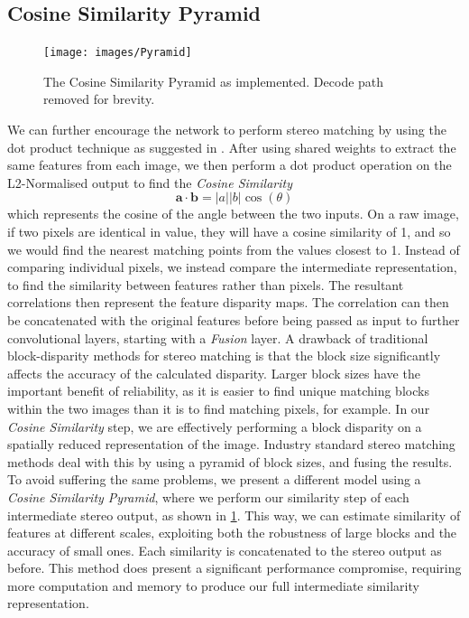 \documentclass[ %
                    author={Gavin Parker},
                supervisor={Dr. Neill Campbell},
                    degree={MEng},
                     title={Deep Learning for Illumination Estimation from Stereo Images},
                  subtitle={},
                      type={Research},
                      year={2018} ]{dissertation}
\begin{document}
\subsection{Cosine Similarity Pyramid}
\begin{figure}[H]
\label{fig:pyramid}
\centering
\texttt{[image: images/Pyramid]}
\caption{The Cosine Similarity Pyramid as implemented. Decode path removed for brevity.}
\end{figure}
We can further encourage the network to perform stereo matching by using the dot product technique as suggested in \cite{7780983}. After using shared weights to extract the same features from each image, we then perform a dot product operation on the L2-Normalised output to find the \textit{Cosine Similarity}
\[\bm{a}\cdot \bm{b} = \lvert a \rvert \lvert b\rvert \cos(\theta) \]
which represents the cosine of the angle between the two inputs. On a raw image, if two pixels are identical in value, they will have a cosine similarity of 1, and so we would find the nearest matching points from the values closest to 1. Instead of comparing individual pixels, we instead compare the intermediate representation, to find the similarity between features rather than pixels. The resultant correlations then represent the feature disparity maps. The correlation can then be concatenated with the original features before being passed as input to further convolutional layers, starting with a \textit{Fusion} layer.
\newline
A drawback of traditional block-disparity methods for stereo matching is that the block size significantly affects the accuracy of the calculated disparity. Larger block sizes have the important benefit of reliability, as it is easier to find unique matching blocks within the two images than it is to find matching pixels, for example. In our \textit{Cosine Similarity} step, we are effectively performing a block disparity on a spatially reduced representation of the image. Industry standard stereo matching methods deal with this by using a pyramid of block sizes, and fusing the results. To avoid suffering the same problems, we present a different model using a \textit{Cosine Similarity Pyramid}, where we perform our similarity step of each intermediate stereo output, as shown in \ref{fig:pyramid}. This way, we can estimate similarity of features at different scales, exploiting both the robustness of large blocks and the accuracy of small ones. Each similarity is concatenated to the stereo output as before. This method does present a significant performance compromise, requiring more computation and memory to produce our full intermediate similarity representation.
\end{document}
